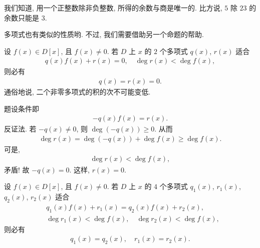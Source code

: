 我们知道, 用一个正整数除非负整数, 所得的余数与商是唯一的. 比方说, $5$ 除 $23$ 的余数只能是 $3$.

多项式也有类似的性质哟. 不过, 我们需要借助另一个命题的帮助.

\begin{proposition}
    设 $f(x) \in D[x]$, 且 $f(x) \neq 0$. 若 $D$ 上 $x$ 的 $2$ 个多项式 $q(x)$, $r(x)$ 适合
    \begin{align*}
        q(x) f(x) + r(x) = 0, \quad \deg r(x) < \deg f(x),
    \end{align*}
    则必有
    \begin{align*}
        q(x) = r(x) = 0.
    \end{align*}
    通俗地说, 二个非零多项式的积的次不可能变低.
\end{proposition}

\begin{pf}
    题设条件即
    \begin{align*}
        -q(x) f(x) = r(x).
    \end{align*}
    反证法. 若 $-q(x) \neq 0$, 则 $\deg (-q(x)) \geq 0$. 从而
    \begin{align*}
        \deg r(x) = \deg (-q(x)) + \deg f(x) \geq \deg f(x).
    \end{align*}
    可是,
    \begin{align*}
        \deg r(x) < \deg f(x),
    \end{align*}
    矛盾! 故 $-q(x) = 0$. 这样, $r(x) = 0$.
\end{pf}

\begin{proposition}
    设 $f(x) \in D[x]$, 且 $f(x) \neq 0$. 若 $D$ 上 $x$ 的 $4$ 个多项式 $q_1 (x)$, $r_1 (x)$, $q_2 (x)$, $r_2 (x)$ 适合
    \begin{align*}
         & q_1 (x) f(x) + r_1 (x) = q_2 (x) f(x) + r_2 (x),          \\
         & \deg r_1 (x) < \deg f(x), \quad \deg r_2 (x) < \deg f(x),
    \end{align*}
    则必有
    \begin{align*}
        q_1 (x) = q_2 (x), \quad r_1 (x) = r_2 (x).
    \end{align*}
\end{proposition}


